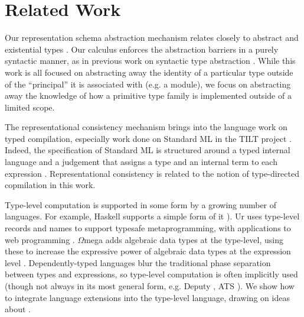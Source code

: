 \documentclass[9pt,preprint]{sigplanconf}
\begin{document}
%
%
\section{Related Work}\label{related-work}
Our representation schema abstraction mechanism relates closely to abstract and existential types \cite{pfpl,atpl}. Our calculus enforces the abstraction barriers  in a purely syntactic manner, as in previous work on syntactic type abstraction \cite{syntypeabs}. While this work is all focused on abstracting away the identity of a particular type outside of the ``principal'' it is associated with (e.g. a module), we focus on abstracting away the knowledge of how a primitive type family is implemented outside of a limited scope.

The representational consistency mechanism brings into the language work on typed compilation, especially work done on Standard ML in the TILT project \cite{tilt}. Indeed, the specification of Standard ML is structured around a typed internal language and a judgement that assigns a type and an internal term to each expression \cite{smlstd}. Representational consistency is related to the notion of type-directed copmilation in this work.

Type-level computation is supported in some form by a growing number of languages. For example, Haskell supports a simple form of it \cite{Chakravarty:2005:ATC}). Ur uses type-level records and names to support typesafe metaprogramming, with applications to web programming \cite{conf/pldi/Chlipala10}. $\Omega$mega adds algebraic data types at the type-level, using these to increase the expressive power of algebraic data types at the expression level \cite{conf/cefp/SheardL07}. Dependently-typed languages blur the traditional phase separation between types and expressions, so type-level computation is often implicitly used (though not always in its most general form, e.g. Deputy \cite{conf/icfp/ChenX05}, ATS \cite{conf/esop/ConditHAGN07}). We show how to integrate language extensions into the type-level language, drawing on ideas about \cite{activelibraries}.

\end{document}
